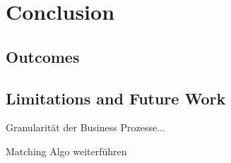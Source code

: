 \chapter{Conclusion}
\label{ch:Conclusion}

\section{Outcomes}

\section{Limitations and Future Work}
Granularität der Business Prozesse...


Matching Algo weiterführen
